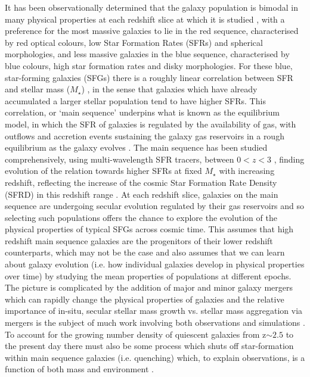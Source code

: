 \documentclass[fleqn,usenatbib]{mn2e}
\begin{document}
It has been observationally determined that the galaxy population is bimodal in many physical properties at each redshift slice at which it is studied \citep[e.g. as described in][]{Dekel2006}, with a preference for the most massive galaxies to lie in the red sequence, characterised by red optical colours, low Star Formation Rates (SFRs) and spherical morphologies, and less massive galaxies in the blue sequence, characterised by blue colours, high star formation rates and disky morphologies. 
For these blue, star-forming galaxies (SFGs) there is a roughly linear correlation between SFR and stellar mass ($M_{\star}$) \citep[e.g.][]{Daddi2007,Noeske2007,Elbaz2007}, in the sense that galaxies which have already accumulated a larger stellar population tend to have higher SFRs.
This correlation, or `main sequence' underpins what is known as the equilibrium model, in which the SFR of galaxies is regulated by the availability of gas, with outflows and accretion events sustaining the galaxy gas reservoirs in a rough equilibrium as the galaxy evolves \citep[e.g.][]{Dave2012,Lilly2013,Saintonge2013}.
The main sequence has been studied comprehensively, using multi-wavelength SFR tracers, between $0 < z < 3$ \citep[e.g.][]{Rodighiero2011,Karim2011,Whitaker2012,Behroozi2013b,Whitaker2014,Rodighiero2014,Speagle2014,Pannella2014,Sobral2014,Sparre2015,Lee2015,Schreiber2015,Renzini2015,Nelson2016}, finding evolution of the relation towards higher SFRs at fixed $M_{\star}$ with increasing redshift, reflecting the increase of the cosmic Star Formation Rate Density (SFRD) in this redshift range \citep{Madau_2014}.
At each redshift slice, galaxies on the main sequence are undergoing secular evolution regulated by their gas reservoirs and so selecting such populations offers the chance to explore the evolution of the physical properties of typical SFGs across cosmic time.
This assumes that high redshift main sequence galaxies are the progenitors of their lower redshift counterparts, which may not be the case \citep[e.g.][]{Gladders2013,Kelson2014,Abramson2016b} and also assumes that we can learn about galaxy evolution (i.e. how individual galaxies develop in physical properties over time) by studying the mean properties of populations at different epochs.
The picture is complicated by the addition of major and minor galaxy mergers which can rapidly change the physical properties of galaxies \citep[e.g.][]{Toomre1977,Lotz2008,Conselice2011,Conselice2014} and the relative importance of in-situ, secular stellar mass growth vs. stellar mass aggregation via mergers is the subject of much work involving both observations and simulations \citep[e.g.][]{Robaina2009,Kaviraj2012,Stott2013,Lofthouse2016,Qu2016}. 
To account for the growing number density of quiescent galaxies from z$\sim 2.5$ to the present day \citep[e.g.][]{Bell2004,Faber2007,Brown2007,Ilbert2010,Brammer2011,Muzzin2013,Buitrago2013} there must also be some process which shuts off star-formation within main sequence galaxies (i.e. quenching) which, to explain observations, is a function of both mass and environment \citep{Peng2010,Darvish2016}.
\end{document}
